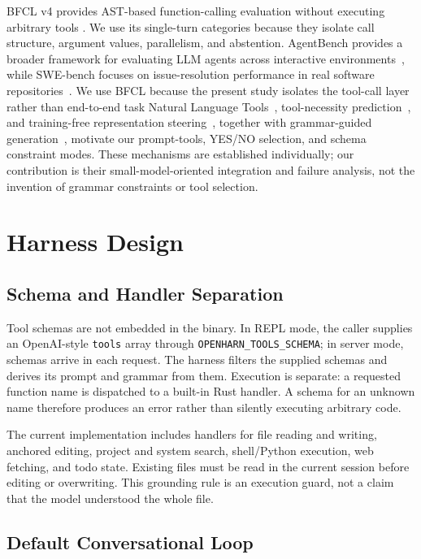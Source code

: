 \documentclass[conference]{IEEEtran}
\begin{document}
BFCL v4 provides AST-based function-calling evaluation without executing arbitrary tools
\cite{patil2025bfcl}. We use its single-turn categories because they isolate call structure,
argument values, parallelism, and abstention. AgentBench provides a broader framework for
evaluating LLM agents across interactive environments~\cite{liu2023agentbench}, while SWE-bench
focuses on issue-resolution performance in real software repositories~\cite{jimenez2024swebench}.
We use BFCL because the present study isolates the tool-call layer rather than end-to-end task
Natural Language Tools~\cite{johnson2025nlt}, tool-necessity prediction~\cite{sun2026probeprefill},
and training-free representation steering~\cite{wang2026asa}, together with grammar-guided
generation~\cite{willard2023guiding}, motivate our prompt-tools, YES/NO selection, and schema
constraint modes. These mechanisms are established individually; our contribution is their
small-model-oriented integration and failure analysis, not the invention of grammar
constraints or tool selection.

\section{Harness Design}

\subsection{Schema and Handler Separation}

Tool schemas are not embedded in the binary. In REPL mode, the caller supplies an OpenAI-style
\texttt{tools} array through \texttt{OPENHARN\_TOOLS\_SCHEMA}; in server mode, schemas arrive
in each request. The harness filters the supplied schemas and derives its prompt and grammar
from them. Execution is separate: a requested function name is dispatched to a built-in Rust
handler. A schema for an unknown name therefore produces an error rather than silently
executing arbitrary code.

The current implementation includes handlers for file reading and writing, anchored editing,
project and system search, shell/Python execution, web fetching, and todo state. Existing
files must be read in the current session before editing or overwriting. This grounding rule
is an execution guard, not a claim that the model understood the whole file.

\subsection{Default Conversational Loop}
\end{document}
